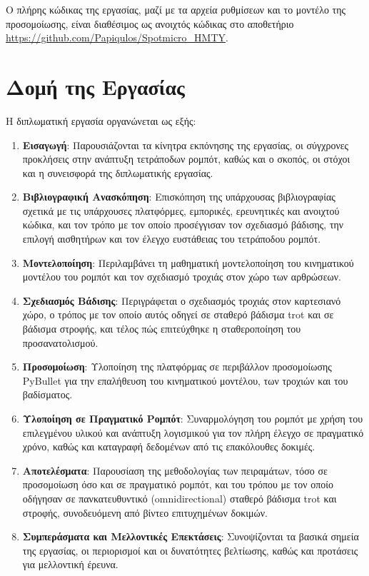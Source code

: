 \documentclass[11pt]{report}
\begin{document}
Ο πλήρης κώδικας της εργασίας, μαζί με τα αρχεία ρυθμίσεων και το μοντέλο της
προσομοίωσης, είναι διαθέσιμος ως ανοιχτός κώδικας στο αποθετήριο
\url{https://github.com/Papiqulos/Spotmicro_HMTY}.

\section{Δομή της Εργασίας}
Η διπλωματική εργασία οργανώνεται ως εξής:
\begin{enumerate}
  \item \textbf{Εισαγωγή}: Παρουσιάζονται τα κίνητρα εκπόνησης της εργασίας, οι
  σύγχρονες προκλήσεις στην ανάπτυξη τετράποδων ρομπότ, καθώς και ο σκοπός, οι
  στόχοι και η συνεισφορά της διπλωματικής εργασίας.
  \item \textbf{Βιβλιογραφική Ανασκόπηση}: Επισκόπηση της υπάρχουσας
  βιβλιογραφίας σχετικά με τις υπάρχουσες πλατφόρμες, εμπορικές, ερευνητικές
  και ανοιχτού κώδικα, και τον τρόπο με τον οποίο προσέγγισαν τον σχεδιασμό
  βάδισης, την επιλογή αισθητήρων και τον έλεγχο ευστάθειας του τετράποδου
  ρομπότ.
  \item \textbf{Μοντελοποίηση}: Περιλαμβάνει τη μαθηματική μοντελοποίηση του
  κινηματικού μοντέλου του ρομπότ και τον σχεδιασμό τροχιάς στον χώρο των
  αρθρώσεων.
  \item \textbf{Σχεδιασμός Βάδισης}: Περιγράφεται ο σχεδιασμός τροχιάς στον
  καρτεσιανό χώρο, ο τρόπος με τον οποίο αυτός οδηγεί σε σταθερό βάδισμα trot
  και σε βάδισμα στροφής, και τέλος πώς επιτεύχθηκε η σταθεροποίηση του
  προσανατολισμού.
  \item \textbf{Προσομοίωση}: Υλοποίηση της πλατφόρμας σε περιβάλλον
  προσομοίωσης PyBullet για την επαλήθευση του κινηματικού μοντέλου, των
  τροχιών και του βαδίσματος.
  \item \textbf{Υλοποίηση σε Πραγματικό Ρομπότ}: Συναρμολόγηση του ρομπότ με
  χρήση του επιλεγμένου υλικού και ανάπτυξη λογισμικού για τον πλήρη έλεγχο σε
  πραγματικό χρόνο, καθώς και καταγραφή δεδομένων από τις επακόλουθες δοκιμές.
  \item \textbf{Αποτελέσματα}: Παρουσίαση της μεθοδολογίας των πειραμάτων, τόσο
  σε προσομοίωση όσο και σε πραγματικό ρομπότ, και του τρόπου με τον οποίο
  οδήγησαν σε πανκατευθυντικό (\foreignlanguage{english}{omnidirectional}) σταθερό βάδισμα trot και
  στροφής, συνοδευόμενη από βίντεο επιτυχημένων δοκιμών.
  \item \textbf{Συμπεράσματα και Μελλοντικές Επεκτάσεις}: Συνοψίζονται τα βασικά
  σημεία της εργασίας, οι περιορισμοί και οι δυνατότητες βελτίωσης, καθώς και
  προτάσεις για μελλοντική έρευνα.
\end{enumerate}
\end{document}
